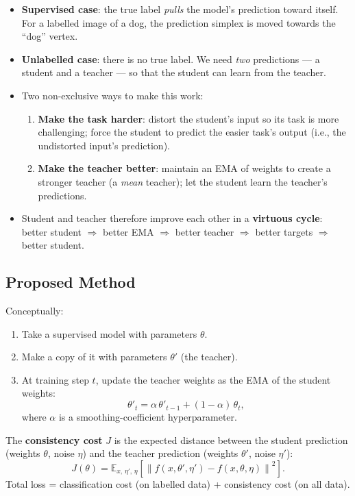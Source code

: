 \documentclass[11pt,a4paper]{article}
\theoremstyle{definition}
\theoremstyle{plain}
\theoremstyle{remark}
\begin{document}
\begin{itemize}
    \item \textbf{Supervised case}: the true label \emph{pulls} the model's prediction toward itself. For a labelled image of a dog, the prediction simplex is moved towards the ``dog'' vertex.
    \item \textbf{Unlabelled case}: there is no true label. We need \emph{two} predictions --- a student and a teacher --- so that the student can learn from the teacher.
    \item Two non-exclusive ways to make this work:
    \begin{enumerate}
        \item \textbf{Make the task harder}: distort the student's input so its task is more challenging; force the student to predict the easier task's output (i.e., the undistorted input's prediction).
        \item \textbf{Make the teacher better}: maintain an EMA of weights to create a stronger teacher (a \textit{mean} teacher); let the student learn the teacher's predictions.
    \end{enumerate}
    \item Student and teacher therefore improve each other in a \textbf{virtuous cycle}: better student $\Rightarrow$ better EMA $\Rightarrow$ better teacher $\Rightarrow$ better targets $\Rightarrow$ better student.
\end{itemize}

\subsection{Proposed Method}

Conceptually:
\begin{enumerate}
    \item Take a supervised model with parameters $\theta$.
    \item Make a copy of it with parameters $\theta'$ (the teacher).
    \item At training step $t$, update the teacher weights as the EMA of the student weights:
    \begin{equation}
        \theta'_t = \alpha\,\theta'_{t-1} + (1-\alpha)\,\theta_t,
    \end{equation}
    where $\alpha$ is a smoothing-coefficient hyperparameter.
\end{enumerate}

The \textbf{consistency cost} $J$ is the expected distance between the student prediction (weights $\theta$, noise $\eta$) and the teacher prediction (weights $\theta'$, noise $\eta'$):
\begin{equation}
    J(\theta) = \mathbb{E}_{x,\,\eta',\,\eta}\!\left[\left\| f(x,\theta',\eta') - f(x,\theta,\eta) \right\|^2\right].
\end{equation}
Total loss = classification cost (on labelled data) + consistency cost (on all data).
\end{document}
